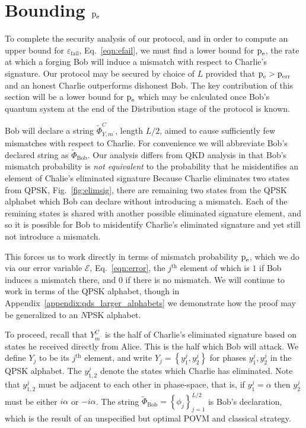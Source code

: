 \section{Bounding $\text{p}_{\text{e}}$}\label{sec:qds_bounding_pe}
To complete the security analysis of our protocol, and in order to compute an upper bound for $\varepsilon_{\text{fail}}$, Eq.~\ref{eqn:efail}, we must find a lower bound for $\text{p}_{\text{e}}$, the rate at which a forging Bob will induce a mismatch with respect to Charlie's signature. Our protocol may be secured by choice of $L$ provided that $\text{p}_{\text{e}} > \text{p}_{\text{err}}$ and an honest Charlie outperforms dishonest Bob. The key contribution of this section will be a lower bound for $\text{p}_{\text{e}}$ which may be calculated once Bob's quantum system at the end of the Distribution stage of the protocol is known.


Bob will declare a string $\tilde{\Phi}_{Y, m^\prime}^C$, length $L/2$,  aimed to cause sufficiently few mismatches with respect to Charlie. For convenience we will abbreviate Bob's declared string as $\tilde{\Phi}_{\text{Bob}}$. %
Our analysis differs from QKD analysis in that Bob's mismatch probability is \emph{not equivalent} to the probability that he misidentifies an element of Chalie's eliminated signature%
Because Charlie eliminates two states from QPSK, Fig.~\ref{fig:elimsig}, there are remaining two states from the QPSK alphabet which Bob can declare without introducing a mismatch. Each of the remining states is shared with another possible eliminated signature element, and so it is possible for Bob to misidentify Charlie's eliminated signature and yet still not introduce a mismatch.

This forces us to work directly in terms of mismatch probability $\text{p}_{\text{e}}$, which we do via our error variable $\mathcal{E}$, Eq.~\ref{eqn:error}, the $j^{\text{th}}$ element of which is $1$ if Bob induces a mismatch there, and $0$ if there is no mismatch. We will continue to work in terms of the QPSK alphabet, though in Appendix~\ref{appendix:qds_larger_alphabets} we demonstrate how the proof may be generalized to an $N$PSK alphabet.

To proceed, recall that $Y_{m^\prime}^C$ is the half of Charlie's eliminated signature based on states he received directly from Alice. This is the half which Bob will attack. We define $Y_j$ to be its $j^{\text{th}}$ element, and write $Y_j = \left\{ y_1^j, y_2^j\right\}$ for phases $y_1^j, y_2^j$ in the QPSK alphabet. The $y_{1,2}^j$ denote the states which Charlie has eliminated. Note that $y_{1,2}^j$ must be adjacent to each other in phase-space, that is, if $y_1^j = \alpha$ then $y_2^j$ must be either $i \alpha$ or $- i \alpha$. The string $\tilde{\Phi}_{\text{Bob}} = \left\{\phi_j\right\}_{j=1}^{L/2}$ is Bob's declaration, which is the result of an unspecified but optimal POVM and classical strategy.

